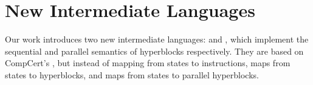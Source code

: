 

\section{New Intermediate Languages}%
\label{sec:rtlblockdef}

Our work introduces two new intermediate languages: \rtlblock{} and \rtlpar{},
which implement the sequential and parallel semantics %
of
hyperblocks respectively.  They are based on CompCert's \rtl{}, but instead of
mapping from states to instructions, \rtlblock{} maps from states to
hyperblocks, and \rtlpar{} maps from states to parallel hyperblocks.

